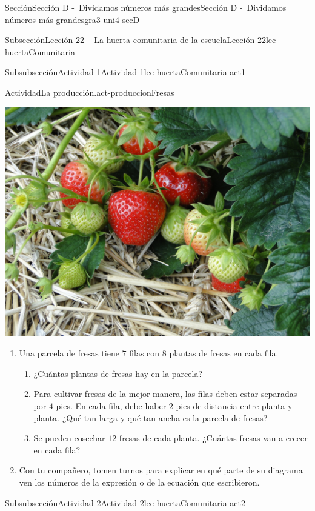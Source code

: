 \documentclass[twoside,10pt,]{article}
\begin{document}
\begin{sectionptx}{Sección}{Sección D -~Dividamos números más grandes}{}{Sección D -~Dividamos números más grandes}{}{}{gra3-uni4-secD}
\begin{subsectionptx}{Subsección}{Lección 22 -~La huerta comunitaria de la escuela}{}{Lección 22}{}{}{lec-huertaComunitaria}
\begin{subsubsectionptx}{Subsubsección}{Actividad 1}{}{Actividad 1}{}{}{lec-huertaComunitaria-act1}
\begin{activity}{Actividad}{La producción.}{act-produccionFresas}
\begin{sidebyside}{2}{0.025}{0.025}{0.05}
\begin{sbspanel}{0.3}
\includegraphics[width=\linewidth]{external/jpg-source/3-4-D-22 Act1-Fresas.jpg}
\end{sbspanel}%
\end{sidebyside}%
%
\begin{enumerate}
\item{}Una parcela de fresas tiene \(7\) filas con \(8\) plantas de fresas en cada fila.%
%
\begin{enumerate}
\item{}¿Cuántas plantas de fresas hay en la parcela?%
\item{}Para cultivar fresas de la mejor manera, las filas deben estar separadas por \(4\) pies. En cada fila, debe haber \(2\) pies de distancia entre planta y planta. ¿Qué tan larga y qué tan ancha es la parcela de fresas?%
\item{}Se pueden cosechar \(12\) fresas de cada planta. ¿Cuántas fresas van a crecer en cada fila?%
\end{enumerate}
\item{}Con tu compañero, tomen turnos para explicar en qué parte de su diagrama ven los números de la expresión o de la ecuación que escribieron.%
\end{enumerate}
\end{activity}%
%
\end{subsubsectionptx}
%
%
\typeout{************************************************}
\typeout{************************************************}
%
\begin{subsubsectionptx}{Subsubsección}{Actividad 2}{}{Actividad 2}{}{}{lec-huertaComunitaria-act2}

\end{subsubsectionptx}
\end{subsectionptx}
\end{sectionptx}
\end{document}
